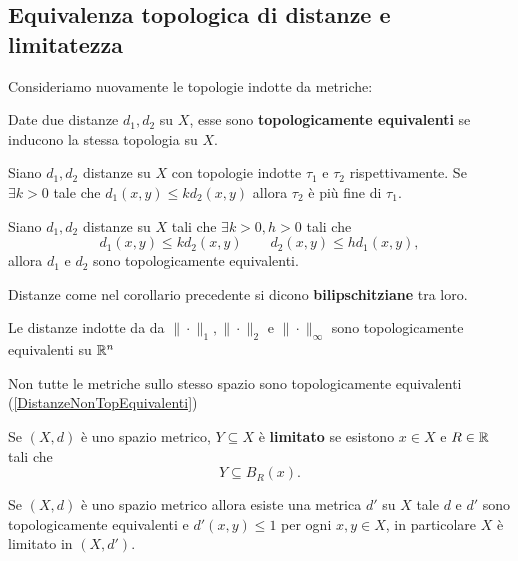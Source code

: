 \begin{multicols*}{2}
\subsection{Equivalenza topologica di distanze e limitatezza} Consideriamo nuovamente le topologie indotte da metriche:\begin{definition}
Date due distanze $d_1,d_2$ su $X$, esse sono \textbf{topologicamente equivalenti} se inducono la stessa topologia su $X$.
\end{definition}

\begin{proposition}\label{ConfrontoTraDistanze}
Siano $d_1,d_2$ distanze su $X$ con topologie indotte $\tau_1$ e $\tau_2$ rispettivamente. Se $\exists k>0$ tale che $d_1(x,y)\leq k d_2(x,y)$ allora $\tau_2$ è più fine di $\tau_1$.
\end{proposition}
\begin{corollary}\label{CriterioEquivalenzaDistanze}
Siano $d_1,d_2$ distanze su $X$ tali che $\exists k>0,h>0$ tali che
\[d_1(x,y)\leq kd_2(x,y)\qquad d_2(x,y)\leq h d_1(x,y),\]
allora $d_1$ e $d_2$ sono topologicamente equivalenti.
\end{corollary}
\begin{notation}
Distanze come nel corollario precedente si dicono \textbf{bilipschitziane} tra loro.
\end{notation}
\begin{corollary}\label{Norme12inftySonoEquivalenti}
Le distanze indotte da da $\|\cdot\|_1,\|\cdot\|_2$ e $\|\cdot\|_\infty$ sono topologicamente equivalenti su $\mathbb{R}^n$
\end{corollary}

\begin{remark}
Non tutte le metriche sullo stesso spazio sono topologicamente equivalenti (\ref{DistanzeNonTopEquivalenti})
\end{remark}

\begin{definition}[Limitatezza]
Se $(X,d)$ è uno spazio metrico, $Y\subseteq X$ è \textbf{limitato} se esistono $x\in X$ e $R\in \mathbb{R}$ tali che
\[Y\subseteq B_R(x).\]
\end{definition}
\begin{proposition}\label{OgniMetricoETopologicamenteEquivalenteALimitato}
Se $(X,d)$ è uno spazio metrico allora esiste una metrica $d'$ su $X$ tale $d$ e $d'$ sono topologicamente equivalenti e $d'(x,y)\leq 1$ per ogni $x,y\in X$, in particolare $X$ è limitato in $(X,d')$.
\end{proposition}


\end{multicols*}

